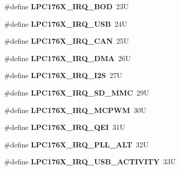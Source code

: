 \begin{DoxyCompactItemize}
\#define {\bfseries L\+P\+C176\+X\+\_\+\+I\+R\+Q\+\_\+\+B\+OD}~23U
\item 
\mbox{\label{group__bsp__interrupt_gaf35c0252350ccc60f992b4e0e5c06f4b}} 
\#define {\bfseries L\+P\+C176\+X\+\_\+\+I\+R\+Q\+\_\+\+U\+SB}~24U
\item 
\mbox{\label{group__bsp__interrupt_ga7f29aa7021a802d01b619bf112a31044}} 
\#define {\bfseries L\+P\+C176\+X\+\_\+\+I\+R\+Q\+\_\+\+C\+AN}~25U
\item 
\mbox{\label{group__bsp__interrupt_ga667a2adb793c58ff953f170db13a86bb}} 
\#define {\bfseries L\+P\+C176\+X\+\_\+\+I\+R\+Q\+\_\+\+D\+MA}~26U
\item 
\mbox{\label{group__bsp__interrupt_gaa607227d3a07a57a206766177d2a7778}} 
\#define {\bfseries L\+P\+C176\+X\+\_\+\+I\+R\+Q\+\_\+\+I2S}~27U
\item 
\mbox{\label{group__bsp__interrupt_gae219fc17d79c1fdc953f6223ecd7dd4b}} 
\#define {\bfseries L\+P\+C176\+X\+\_\+\+I\+R\+Q\+\_\+\+S\+D\+\_\+\+M\+MC}~29U
\item 
\mbox{\label{group__bsp__interrupt_ga8c4f30e1cd14dd9ed69a6ea4b0d5d1b0}} 
\#define {\bfseries L\+P\+C176\+X\+\_\+\+I\+R\+Q\+\_\+\+M\+C\+P\+WM}~30U
\item 
\mbox{\label{group__bsp__interrupt_ga2421a56355f5db1bfda8a5b6c9b230a0}} 
\#define {\bfseries L\+P\+C176\+X\+\_\+\+I\+R\+Q\+\_\+\+Q\+EI}~31U
\item 
\mbox{\label{group__bsp__interrupt_ga4356c780eaee90dca50088baf121068d}} 
\#define {\bfseries L\+P\+C176\+X\+\_\+\+I\+R\+Q\+\_\+\+P\+L\+L\+\_\+\+A\+LT}~32U
\item 
\mbox{\label{group__bsp__interrupt_gae9c20d56b1aed3eb904332880b496516}} 
\#define {\bfseries L\+P\+C176\+X\+\_\+\+I\+R\+Q\+\_\+\+U\+S\+B\+\_\+\+A\+C\+T\+I\+V\+I\+TY}~33U
\item 
\mbox{\label{group__bsp__interrupt_ga11ad283df1361b8d90e0220a6e590cfe}} 

\end{DoxyCompactItemize}
